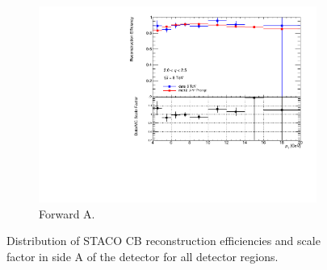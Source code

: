 \begin{figure}[htbp]
  \begin{subfigure}[b]{0.45\textwidth}
    \includegraphics[width=\textwidth]{PartCalibration2012/Plots/SFPlots/Forward_A_reco.pdf}
    \caption{Forward A.} \label{fig:CalibrationRecoSFForwardA}
  \end{subfigure}
  \caption{Distribution of STACO CB reconstruction efficiencies and scale factor in side A of the detector for all detector regions.}
  \label{fig:RecoEffSideA}
\end{figure}

